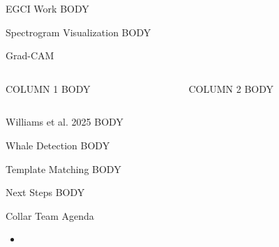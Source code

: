 \begin{frame}{EGCI Work}
    BODY
\end{frame}

\begin{frame}{Spectrogram Visualization}
    BODY
\end{frame}

\begin{frame}{Grad-CAM}
    \begin{columns}
        \begin{column}{0.5\textwidth}
            COLUMN 1 BODY
        \end{column}
        \begin{column}{0.5\textwidth}
            COLUMN 2 BODY
        \end{column}
    \end{columns}
\end{frame}

\begin{frame}{Williams et al. 2025}
    BODY
\end{frame}

\begin{frame}{Whale Detection}
    BODY
\end{frame}

\begin{frame}{Template Matching}
    BODY
\end{frame}

\begin{frame}{Next Steps}
    BODY
\end{frame}

\begin{frame}{Collar Team Agenda}
    \begin{itemize}
        \item 
    \end{itemize}
\end{frame}